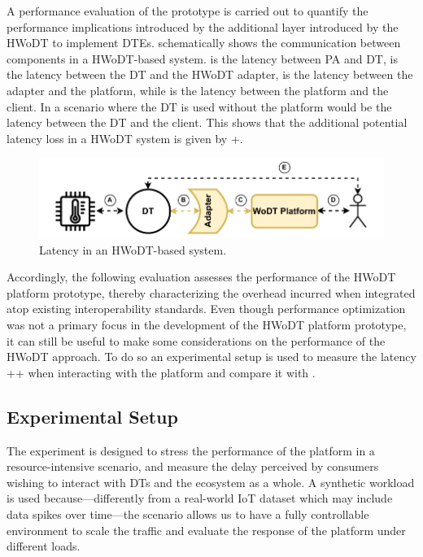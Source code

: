 A performance evaluation of the prototype is carried out to quantify the performance implications introduced by the additional layer introduced by the \ac{HWoDT} to implement \acp{DTE}.
%
 schematically shows the communication between components in a \ac{HWoDT}-based system.  is the latency between \ac{PA} and \ac{DT},  is the latency between the \ac{DT} and the \ac{HWoDT} adapter,  is the latency between the adapter and the platform, while  is the latency between the platform and the client. In a scenario where the DT is used without the platform  would be the latency between the DT and the client. This shows that the additional potential latency loss in a \ac{HWoDT} system is given by +.

\begin{figure}
  \centering
  \includegraphics[width=0.8\columnwidth]{figures/hwodt/HWoDT-latency.pdf}
  \caption{Latency in an HWoDT-based system.}
  \label{fig:latency-hwodt}
\end{figure}

Accordingly, the following evaluation assesses the performance of the \ac{HWoDT} platform prototype, thereby characterizing the overhead incurred when integrated atop existing interoperability standards.
Even though performance optimization was not a primary focus in the development of the \ac{HWoDT} platform prototype, it can still be useful to make some considerations on the performance of the \ac{HWoDT} approach.
%
To do so an experimental setup is used to measure the latency ++ when interacting with the platform and compare it with .

\subsection{Experimental Setup}

The experiment is designed to stress the performance of the platform in a resource-intensive scenario, and measure the delay perceived by consumers wishing to interact with \acp{DT} and the ecosystem as a whole.
%
A synthetic workload is used because---differently from a real-world \ac{IoT} dataset which may include data spikes over time---the scenario allows us to have a fully controllable environment to scale the traffic and evaluate the response of the platform under different loads.

